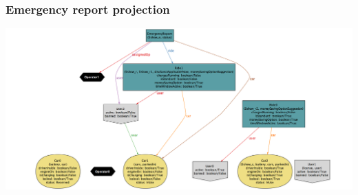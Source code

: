 \begin{landscape}
	\subsubsection{Emergency report projection}
		\includegraphics[width=2\textwidth, center]{img/emergency_reports.png}
	\end{landscape}